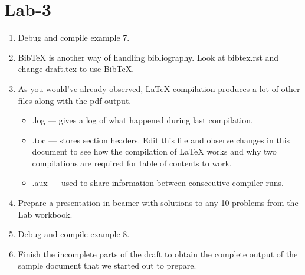 \documentclass[11pt]{article}
\begin{document}
\section{Lab-3}
\label{sec-3}


\begin{enumerate}
\item Debug and compile example 7.
\item BibTeX is another way of handling bibliography. Look at
       bibtex.rst and change draft.tex to use BibTeX.
\item As you would've already observed, \LaTeX{} compilation produces a
       lot of other files along with the pdf output.

\begin{itemize}
\item .log --- gives a log of what happened during last
         compilation.
\item .toc --- stores section headers. Edit this file and observe
         changes in this document to see how the compilation of \LaTeX{}
         works and why two compilations are required for table of
         contents to work.
\item .aux --- used to share information between consecutive
         compiler runs.
\end{itemize}

\item Prepare a presentation in beamer with solutions to any 10
       problems from the Lab workbook.
\item Debug and compile example 8.
\item Finish the incomplete parts of the draft to obtain the complete
       output of the sample document that we started out to prepare.
\end{enumerate}
\end{document}

